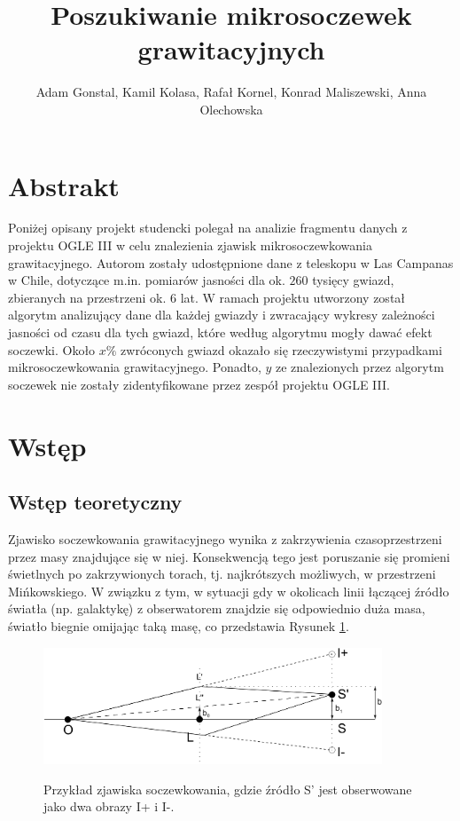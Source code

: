\documentclass[a4paper,11pt]{article}
\author{Adam Gonstal, Kamil Kolasa, Rafał Kornel, Konrad Maliszewski, Anna Olechowska}
\title{Poszukiwanie mikrosoczewek grawitacyjnych}
\newcommand{\ak}{\hspace{0.7 cm}}
\begin{document}
\maketitle
\newpage
\tableofcontents
\newpage
\section{Abstrakt}
\ak Poniżej opisany projekt studencki polegał na analizie fragmentu danych z projektu OGLE III w celu znalezienia zjawisk mikrosoczewkowania grawitacyjnego.  Autorom zostały udostępnione dane z teleskopu w Las Campanas w Chile, dotyczące m.in. pomiarów jasności dla ok. $260$ tysięcy  gwiazd, zbieranych na przestrzeni ok. $6$ lat. W ramach projektu utworzony został algorytm analizujący dane dla każdej gwiazdy i zwracający wykresy zależności jasności od czasu dla tych gwiazd, które według algorytmu mogły dawać efekt soczewki. Około $x\%$ zwróconych gwiazd okazało się rzeczywistymi przypadkami mikrosoczewkowania grawitacyjnego. Ponadto, $y$ ze znalezionych przez algorytm soczewek nie zostały zidentyfikowane przez zespół projektu OGLE III.
\section{Wstęp}
\subsection{Wstęp teoretyczny}
\ak Zjawisko soczewkowania grawitacyjnego wynika z zakrzywienia czasoprzestrzeni przez masy znajdujące się w niej. Konsekwencją tego jest poruszanie się promieni świetlnych po zakrzywionych torach, tj. najkrótszych możliwych, w przestrzeni Mińkowskiego. W związku z tym, w sytuacji gdy w okolicach linii łączącej źródło światła (np. galaktykę) z obserwatorem znajdzie się odpowiednio duża masa, światło biegnie omijając taką masę, co przedstawia Rysunek \ref{Fig_1}. 

\begin{figure}[h]
\centering
\includegraphics[width=0.9\textwidth]{Fig/Lens.jpeg}
\label{Fig_1}
\caption{Przykład zjawiska soczewkowania, gdzie źródło S' jest obserwowane jako dwa obrazy I+ i I-\cite{Lens}.}
\end{figure}
\end{document}
